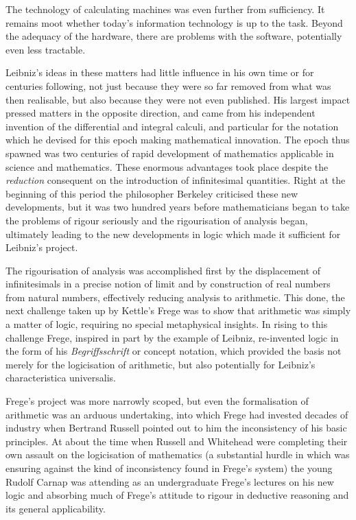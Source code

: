 The technology of calculating machines was even further from sufficiency.
It remains moot whether today's information technology is up to the task.
Beyond the adequacy of the hardware, there are problems with the software, potentially even less tractable.

Leibniz's ideas in these matters had little influence in his own time or for centuries following, not just because they were so far removed from what was then realisable, but also because they were not even published.
His largest impact pressed matters in the opposite direction, and came from his independent invention of the differential and integral calculi, and particular for the notation which he devised for this epoch making mathematical innovation.
The epoch thus spawned was two centuries of rapid development of mathematics applicable in science and mathematics.
These enormous advantages took place despite the \emph{reduction} consequent on the introduction of infinitesimal quantities.
Right at the beginning of this period the philosopher Berkeley criticised these new developments, but it was two hundred years before mathematicians began to take the problems of rigour seriously and the rigourisation of analysis began, ultimately leading to the new developments in logic which made it sufficient for Leibniz's project.

The rigourisation of analysis was accomplished first by the displacement of infinitesimals in a precise notion of limit and by construction of real numbers from natural numbers, effectively reducing analysis to arithmetic.
This done, the next challenge taken up by Kettle's Frege was to show that arithmetic was simply a matter of logic, requiring no special metaphysical insights.
In rising to this challenge Frege, inspired in part by the example of Leibniz, re-invented logic in the form of his \emph{Begriffsschrift} or concept notation, which provided the basis not merely for the logicisation of arithmetic, but also potentially for Leibniz's characteristica universalis.

Frege's project was more narrowly scoped, but even the formalisation of arithmetic was an arduous undertaking, into which Frege had invested decades of industry when Bertrand Russell pointed out to him the inconsistency of his basic principles.
At about the time when Russell and Whitehead were completing their own assault on the logicisation of mathematics (a substantial hurdle in which was ensuring against the kind of inconsistency found in Frege's system) the young Rudolf Carnap was attending as an undergraduate Frege's lectures on his new logic and absorbing much of Frege's attitude to rigour in deductive reasoning and its general applicability.

